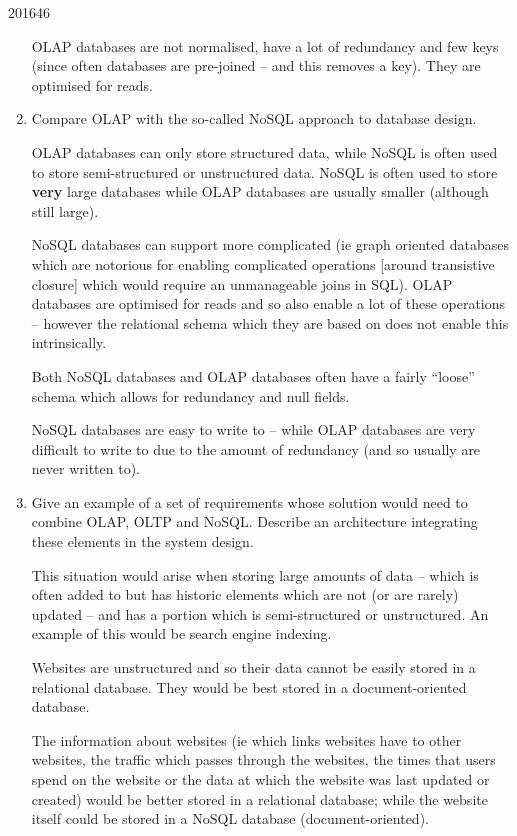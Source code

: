 \documentclass[10pt,\jkfside,a4paper]{article}
\begin{document}
\begin{examquestion}{2016}{4}{6}
\begin{enumerate}
OLAP databases are not normalised, have a lot of redundancy and few keys (since 
often databases are pre-joined -- and this removes a key). They are optimised for reads.

\item{Compare OLAP with the so-called NoSQL approach to database design.}

OLAP databases can only store structured data, while NoSQL is often used to store
semi-structured or unstructured data. NoSQL is often used to store \textbf{very} 
large databases while OLAP databases are usually smaller (although still large).

NoSQL databases can support more complicated (ie graph oriented 
databases which are notorious for enabling complicated operations [around transistive 
closure] which would require an unmanageable joins in SQL). 
OLAP databases are optimised for reads and so also enable a lot of these operations 
-- however the relational schema which they are based on does not enable this 
intrinsically.

Both NoSQL databases and OLAP databases often have a fairly ``loose'' schema which 
allows for redundancy and null fields.

NoSQL databases are easy to write to -- while OLAP databases are very difficult to 
write to due to the amount of redundancy (and so usually are never written to).

\item{Give an example of a set of requirements whose solution would need 
to combine OLAP, OLTP and NoSQL. Describe an architecture integrating these 
elements in the system design.}

This situation would arise when storing large amounts of data -- which is often 
added to but has historic elements which are not (or are rarely) updated -- and 
has a portion which is semi-structured or unstructured.
\newline
\newline
An example of this would be search engine indexing.

Websites are unstructured and so their data cannot be easily stored in a relational 
database. They would be best stored in a document-oriented database.

The information about websites (ie which links websites have to other websites, 
the traffic which passes through the websites, the times that users spend on the 
website or the data at which the website was last updated or created) would be 
better stored in a relational database; while the website itself could be stored 
in a NoSQL database (document-oriented).


\end{enumerate}
\end{examquestion}
\end{document}
